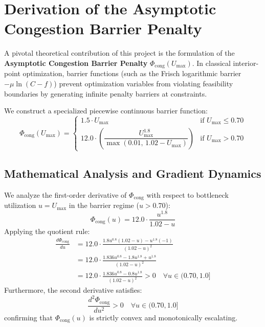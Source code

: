 \documentclass[12pt,a4paper,oneside]{report}
\begin{document}
\section{Derivation of the Asymptotic Congestion Barrier Penalty}
A pivotal theoretical contribution of this project is the formulation of the \textbf{Asymptotic Congestion Barrier Penalty} $\Phi_{\text{cong}}(U_{\max})$. In classical interior-point optimization, barrier functions (such as the Frisch logarithmic barrier $-\mu \ln(C - f)$) prevent optimization variables from violating feasibility boundaries by generating infinite penalty barriers at constraints.

We construct a specialized piecewise continuous barrier function:
\begin{equation}
    \Phi_{\text{cong}}(U_{\max}) = \begin{cases}
        1.5 \cdot U_{\max} & \text{if } U_{\max} \le 0.70 \\[0.5em]
        12.0 \cdot \left( \dfrac{U_{\max}^{1.8}}{\max(0.01, \, 1.02 - U_{\max})} \right) & \text{if } U_{\max} > 0.70
    \end{cases}
    \label{eq:barrier_penalty_formal}
\end{equation}

\subsection{Mathematical Analysis and Gradient Dynamics}
We analyze the first-order derivative of $\Phi_{\text{cong}}$ with respect to bottleneck utilization $u = U_{\max}$ in the barrier regime ($u > 0.70$):
\begin{equation}
    \Phi_{\text{cong}}(u) = 12.0 \cdot \frac{u^{1.8}}{1.02 - u}
\end{equation}
Applying the quotient rule:
\begin{align}
    \frac{d \Phi_{\text{cong}}}{du} &= 12.0 \cdot \frac{1.8 u^{0.8}(1.02 - u) - u^{1.8}(-1)}{(1.02 - u)^2} \nonumber \\
    &= 12.0 \cdot \frac{1.836 u^{0.8} - 1.8 u^{1.8} + u^{1.8}}{(1.02 - u)^2} \nonumber \\
    &= 12.0 \cdot \frac{1.836 u^{0.8} - 0.8 u^{1.8}}{(1.02 - u)^2} > 0 \quad \forall u \in (0.70, 1.0]
\end{align}
Furthermore, the second derivative satisfies:
\begin{equation}
    \frac{d^2 \Phi_{\text{cong}}}{du^2} > 0 \quad \forall u \in (0.70, 1.0]
\end{equation}
confirming that $\Phi_{\text{cong}}(u)$ is strictly convex and monotonically escalating.
\end{document}
